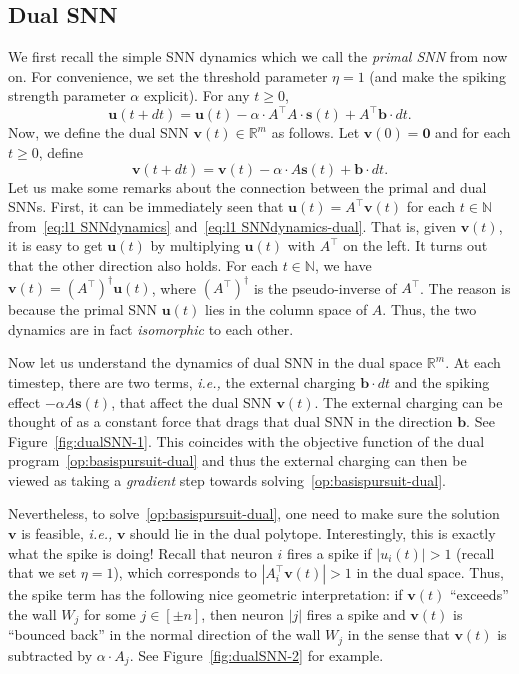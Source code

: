 \documentclass[11pt]{article}
\theoremstyle{remark}
\theoremstyle{definition}
\newcommand{\bb}{\mathbf{b}}
\newcommand{\bv}{\mathbf{v}}
\newcommand{\bu}{\mathbf{u}}
\newcommand{\bs}{\mathbf{s}}
\newcommand{\ATA}{A^\top A}
\newcommand{\ATb}{A^\top\bb}
\newcommand{\R}{{\mathbb R}} %
\newcommand{\N}{{\mathbb{N}}} %
\begin{document}
\subsection{Dual SNN} \label{sec:dual SNN}
We first recall the simple SNN dynamics which we call the \textit{primal SNN} from now on. For convenience, we set the threshold parameter $\eta = 1$ (and make the spiking strength parameter $\alpha$ explicit). For any $t\geq0$,
\begin{equation}\label{eq:l1 SNNdynamics}
\bu(t+dt) = \bu(t)-  \alpha \cdot \ATA \cdot \bs(t)+ \ATb \cdot dt.
\end{equation}
Now, we define the dual SNN $\bv(t) \in \R^m$ as follows. Let $\bv(0)=\mathbf{0}$ and for each $t\geq0$, define
\begin{equation}\label{eq:l1 SNNdynamics-dual}
\bv(t+dt) = \bv(t) - \alpha \cdot A\bs(t) + \bb\cdot dt.
\end{equation}
Let us make some remarks about the connection between the primal and dual SNNs. First, it can be immediately seen that $\bu(t)=A^\top\bv(t)$ for each $t\in\N$ from~\eqref{eq:l1 SNNdynamics} and~\eqref{eq:l1 SNNdynamics-dual}. That is, given $\bv(t)$, it is easy to get $\bu(t)$ by multiplying $\bu(t)$ with $A^\top$ on the left. It turns out that the other direction also holds. For each $t\in\N$, we have $\bv(t) = (A^\top )^{\dagger}\bu(t)$, where $(A^\top)^{\dagger}$ is the pseudo-inverse of $A^\top$. The reason is because the primal SNN $\bu(t)$ lies in the column space of $A$. Thus, the two dynamics are in fact \emph{isomorphic} to each other.

Now let us understand the dynamics of dual SNN in the dual space $\R^m$. At each timestep, there are two terms, \textit{i.e.,} the external charging $\bb\cdot dt$ and the spiking effect $-\alpha A\bs(t)$, that affect the dual SNN $\bv(t)$. The external charging can be thought of as a constant force that drags that dual SNN in the direction $\bb$. See Figure~\ref{fig:dualSNN-1}. This coincides with the objective function of the dual program~\eqref{op:basispursuit-dual} and thus the external charging can then be viewed as taking a \textit{gradient} step towards solving~\eqref{op:basispursuit-dual}.

Nevertheless, to solve~\eqref{op:basispursuit-dual}, one need to make sure the solution $\bv$ is feasible, \textit{i.e.,} $\bv$ should lie in the dual polytope. Interestingly, this is exactly what the spike is doing!
Recall that neuron $i$ fires a spike if $|u_i(t)| > 1$ (recall that we set $\eta = 1$), which corresponds to $|A^\top_i \bv(t)| > 1$ in the dual space. Thus, the spike term has the following nice geometric interpretation: if $\bv(t)$ ``exceeds'' the wall $W_j$ for some $j\in [\pm n]$, then neuron $|j|$ fires a spike and $\bv(t)$ is ``bounced back'' in the normal direction of the wall $W_j$ in the sense that $\bv(t)$ is subtracted by $\alpha \cdot A_j$. See Figure~\ref{fig:dualSNN-2} for example.
\end{document}
